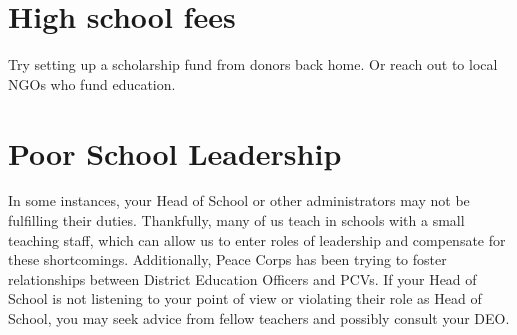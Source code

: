 \section{High school fees}
Try setting up a scholarship fund from donors back home. Or reach out to local NGOs who fund education.

\section{Poor School Leadership}
In some instances, your Head of School or other administrators may not be fulfilling their duties. Thankfully, many of us teach in schools with a small teaching staff, which can allow us to enter roles of leadership and compensate for these shortcomings.  Additionally, Peace Corps has been trying to foster relationships between District Education Officers and PCVs.  If your Head of School is not listening to your point of view or violating their role as Head of School, you may seek advice from fellow teachers and possibly consult your DEO.
